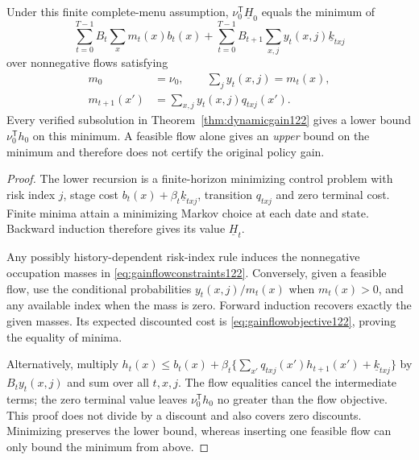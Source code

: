 \begin{proposition}
\label{prop:gainoccupations122}
Under this finite complete-menu assumption,
$\nu_0^{\mathsf T}\underline H_0$ equals the minimum of
\begin{equation}\label{eq:gainflowobjective122}
 \sum_{t=0}^{T-1} B_t\sum_x m_t(x)b_t(x)
 +\sum_{t=0}^{T-1} B_{t+1}\sum_{x,j}
                         y_t(x,j)\underline k_{txj}
\end{equation}
over nonnegative flows satisfying
\begin{align}
 m_0&=\nu_0,\qquad
 \sum_jy_t(x,j)=m_t(x),\nonumber\\
 m_{t+1}(x')&=\sum_{x,j}y_t(x,j)q_{txj}(x').
                    \label{eq:gainflowconstraints122}
\end{align}
Every verified subsolution in Theorem~\ref{thm:dynamicgain122} gives a
lower bound $\nu_0^{\mathsf T}h_0$ on this minimum. A feasible flow alone
gives an \emph{upper} bound on the minimum and therefore does not certify
the original policy gain.
\end{proposition}

\begin{proof}
The lower recursion is a finite-horizon minimizing control problem with
risk index $j$, stage cost $b_t(x)+\beta_t\underline k_{txj}$, transition
$q_{txj}$ and zero terminal cost. Finite minima attain a minimizing Markov
choice at each date and state. Backward induction therefore gives its
value $\underline H_t$.

Any possibly history-dependent risk-index rule induces the nonnegative
occupation masses in \eqref{eq:gainflowconstraints122}. Conversely, given
a feasible flow, use the conditional probabilities
$y_t(x,j)/m_t(x)$ when $m_t(x)>0$, and any available index when the mass
is zero. Forward induction recovers exactly the given masses. Its
expected discounted cost is \eqref{eq:gainflowobjective122}, proving
the equality of minima.

Alternatively, multiply
$h_t(x)\le b_t(x)+\beta_t\{\sum_{x'}q_{txj}(x')h_{t+1}(x')+
 \underline k_{txj}\}$
by $B_ty_t(x,j)$ and sum over all $t,x,j$. The flow equalities cancel
the intermediate terms; the zero terminal value leaves
$\nu_0^{\mathsf T}h_0$ no greater than the flow objective. This proof
does not divide by a discount and also covers zero discounts. Minimizing
preserves the lower bound, whereas inserting one feasible flow can only
bound the minimum from above.
\end{proof}

